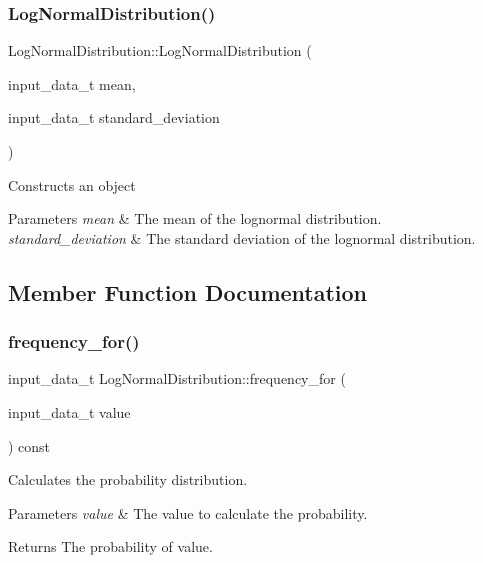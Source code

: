 \subsubsection{\texorpdfstring{Log\+Normal\+Distribution()}{LogNormalDistribution()}}
{\footnotesize\ttfamily Log\+Normal\+Distribution\+::\+Log\+Normal\+Distribution (\begin{DoxyParamCaption}\item[{input\+\_\+data\+\_\+t}]{mean,  }\item[{input\+\_\+data\+\_\+t}]{standard\+\_\+deviation }\end{DoxyParamCaption})\hspace{0.3cm}{\ttfamily [inline]}}

Constructs an object 
\begin{DoxyParams}{Parameters}
{\em mean} & The mean of the lognormal distribution. \\
\hline
{\em standard\+\_\+deviation} & The standard deviation of the lognormal distribution. \\
\hline
\end{DoxyParams}


\subsection{Member Function Documentation}
\mbox{\label{classLogNormalDistribution_aa4a17cea478421db3a75e0728a63c371}} 
\subsubsection{\texorpdfstring{frequency\+\_\+for()}{frequency\_for()}}
{\footnotesize\ttfamily input\+\_\+data\+\_\+t Log\+Normal\+Distribution\+::frequency\+\_\+for (\begin{DoxyParamCaption}\item[{input\+\_\+data\+\_\+t}]{value }\end{DoxyParamCaption}) const\hspace{0.3cm}{\ttfamily [virtual]}}

Calculates the probability distribution. 
\begin{DoxyParams}{Parameters}
{\em value} & The value to calculate the probability. \\
\hline
\end{DoxyParams}
\begin{DoxyReturn}{Returns}
The probability of value. 
\end{DoxyReturn}



